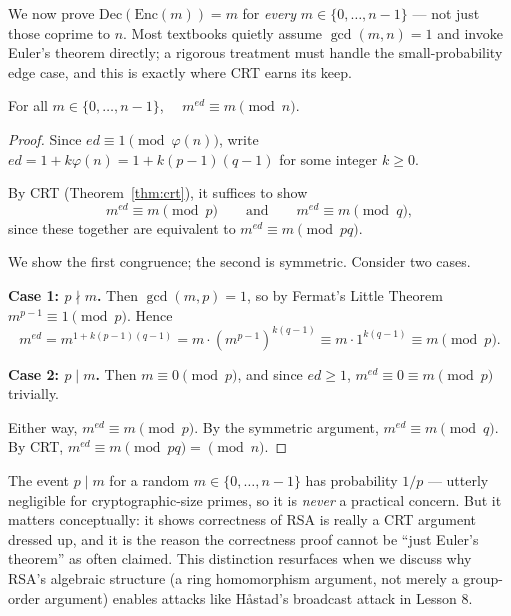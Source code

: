 We now prove $\mathrm{Dec}(\mathrm{Enc}(m)) = m$ for \emph{every} $m \in \{0, \dots, n-1\}$ — not just those coprime to $n$. Most textbooks quietly assume $\gcd(m,n)=1$ and invoke Euler's theorem directly; a rigorous treatment must handle the small-probability edge case, and this is exactly where CRT earns its keep.

\begin{theorem}
For all $m \in \{0, \dots, n-1\}$, $\quad m^{ed} \equiv m \pmod n$.
\end{theorem}

\begin{proof}
Since $ed \equiv 1 \pmod{\varphi(n)}$, write $ed = 1 + k\varphi(n) = 1 + k(p-1)(q-1)$ for some integer $k \geq 0$.

By CRT (Theorem~\ref{thm:crt}), it suffices to show
\[
m^{ed} \equiv m \pmod p \qquad \text{and} \qquad m^{ed} \equiv m \pmod q,
\]
since these together are equivalent to $m^{ed} \equiv m \pmod{pq}$.

We show the first congruence; the second is symmetric. Consider two cases.

\textbf{Case 1: $p \nmid m$.} Then $\gcd(m, p) = 1$, so by Fermat's Little Theorem $m^{p-1} \equiv 1 \pmod p$. Hence
\[
m^{ed} = m^{1 + k(p-1)(q-1)} = m \cdot \left(m^{p-1}\right)^{k(q-1)} \equiv m \cdot 1^{k(q-1)} \equiv m \pmod p.
\]

\textbf{Case 2: $p \mid m$.} Then $m \equiv 0 \pmod p$, and since $ed \geq 1$, $m^{ed} \equiv 0 \equiv m \pmod p$ trivially.

Either way, $m^{ed} \equiv m \pmod p$. By the symmetric argument, $m^{ed} \equiv m \pmod q$. By CRT, $m^{ed} \equiv m \pmod{pq} = \pmod n$.
\end{proof}

\begin{remark}
The event $p \mid m$ for a random $m \in \{0,\dots,n-1\}$ has probability $1/p$ — utterly negligible for cryptographic-size primes, so it is \emph{never} a practical concern. But it matters conceptually: it shows correctness of RSA is really a CRT argument dressed up, and it is the reason the correctness proof cannot be ``just Euler's theorem'' as often claimed. This distinction resurfaces when we discuss why RSA's algebraic structure (a ring homomorphism argument, not merely a group-order argument) enables attacks like Håstad's broadcast attack in Lesson 8.
\end{remark}

